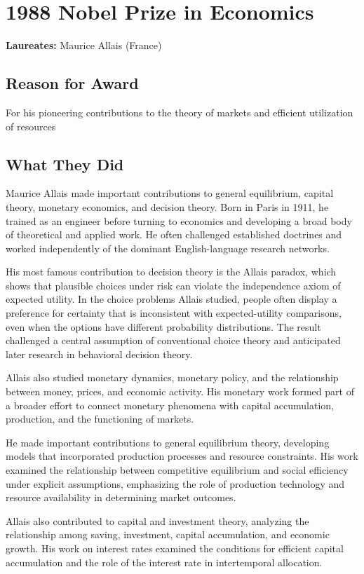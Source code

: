 \chapter{1988 Nobel Prize in Economics}
\textbf{Laureates: }Maurice Allais (France)

\section*{Reason for Award}
For his pioneering contributions to the theory of markets and efficient
utilization of resources

\section{What They Did}
Maurice Allais made important contributions to general equilibrium, capital
theory, monetary economics, and decision theory. Born in Paris in 1911, he
trained as an engineer before turning to economics and developing a broad body
of theoretical and applied work. He often challenged established doctrines and
worked independently of the dominant English-language research networks.

His most famous contribution to decision theory is the Allais paradox, which
shows that plausible choices under risk can violate the independence axiom of
expected utility. In the choice problems Allais studied, people often display
a preference for certainty that is inconsistent with expected-utility
comparisons, even when the options have different probability distributions.
The result challenged a central assumption of conventional choice theory and
anticipated later research in behavioral decision theory.

Allais also studied monetary dynamics, monetary policy, and the relationship
between money, prices, and economic activity. His monetary work formed part of
a broader effort to connect monetary phenomena with capital accumulation,
production, and the functioning of markets.

He made important contributions to general equilibrium theory, developing
models that incorporated production processes and resource constraints. His
work examined the relationship between competitive equilibrium and social
efficiency under explicit assumptions, emphasizing the role of production
technology and resource availability in determining market outcomes.

Allais also contributed to capital and investment theory, analyzing the
relationship among saving, investment, capital accumulation, and economic
growth. His work on interest rates examined the conditions for efficient
capital accumulation and the role of the interest rate in intertemporal
allocation.

